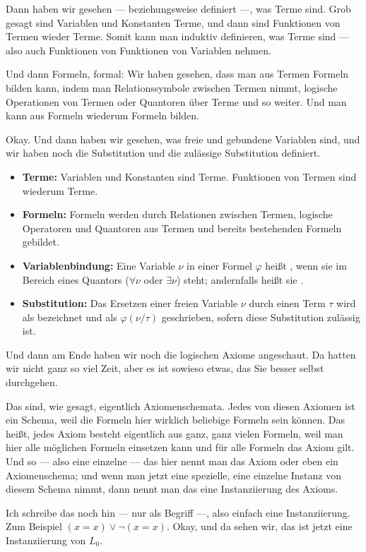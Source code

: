 \begin{spoken-clean}[00:01:27 - 00:02:49]
Dann haben wir gesehen --- beziehungsweise definiert ---, was Terme sind. Grob gesagt sind Variablen und Konstanten Terme, und dann sind Funktionen von Termen wieder Terme. Somit kann man induktiv definieren, was Terme sind --- also auch Funktionen von Funktionen von Variablen nehmen. 

Und dann Formeln, formal: Wir haben gesehen, dass man aus Termen Formeln bilden kann, indem man Relationssymbole zwischen Termen nimmt, logische Operationen von Termen oder Quantoren über Terme und so weiter. Und man kann aus Formeln wiederum Formeln bilden. 

Okay. Und dann haben wir gesehen, was freie und gebundene Variablen sind, und wir haben noch die Substitution und die zulässige Substitution definiert.
\end{spoken-clean}

\begin{math-stroke}
\begin{itemize}
    \item \textbf{Terme:} Variablen und Konstanten sind Terme. Funktionen von Termen sind wiederum Terme.
    \item \textbf{Formeln:} Formeln werden durch Relationen zwischen Termen, logische Operatoren und Quantoren aus Termen und bereits bestehenden Formeln gebildet.
    \item \textbf{Variablenbindung:} Eine Variable $\nu$ in einer Formel $\varphi$ heißt , wenn sie im Bereich eines Quantors ($\forall \nu$ oder $\exists \nu$) steht; andernfalls heißt sie .
    \item \textbf{Substitution:} Das Ersetzen einer freien Variable $\nu$ durch einen Term $\tau$ wird als  bezeichnet und als $\varphi(\nu/\tau)$ geschrieben, sofern diese Substitution zulässig ist.
\end{itemize}
\end{math-stroke}

\begin{spoken-clean}[00:02:49 - 00:04:42]
Und dann am Ende haben wir noch die logischen Axiome angeschaut. Da hatten wir nicht ganz so viel Zeit, aber es ist sowieso etwas, das Sie besser selbst durchgehen. 

Das sind, wie gesagt, eigentlich Axiomenschemata. Jedes von diesen Axiomen ist ein Schema, weil die Formeln hier wirklich beliebige Formeln sein können. Das heißt, jedes Axiom besteht eigentlich aus ganz, ganz vielen Formeln, weil man hier alle möglichen Formeln einsetzen kann und für alle Formeln das Axiom gilt. Und so --- also eine einzelne --- das hier nennt man das Axiom oder eben ein Axiomenschema; und wenn man jetzt eine spezielle, eine einzelne Instanz von diesem Schema nimmt, dann nennt man das eine Instanziierung des Axioms. 

Ich schreibe das noch hin --- nur als Begriff ---, also einfach eine Instanziierung. Zum Beispiel $(x = x) \vee \neg(x = x)$. Okay, und da sehen wir, das ist jetzt eine Instanziierung von $L_0$.
\end{spoken-clean}

